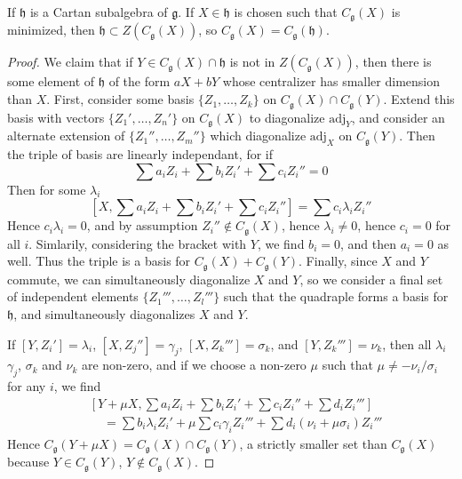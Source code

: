 \begin{lemma}
    If $\mathfrak{h}$ is a Cartan subalgebra of $\mathfrak{g}$. If $X \in \mathfrak{h}$ is chosen such that $C_\mathfrak{g}(X)$ is minimized, then $\mathfrak{h} \subset Z(C_\mathfrak{g}(X))$, so $C_\mathfrak{g}(X) = C_\mathfrak{g}(\mathfrak{h})$.
\end{lemma}
\begin{proof}
    We claim that if $Y \in C_\mathfrak{g}(X) \cap \mathfrak{h}$ is not in $Z(C_\mathfrak{g}(X))$, then there is some element of $\mathfrak{h}$ of the form $aX + bY$ whose centralizer has smaller dimension than $X$. First, consider some basis $\{ Z_1, \dots, Z_k \}$ on $C_\mathfrak{g}(X) \cap C_\mathfrak{g}(Y)$. Extend this basis with vectors $\{ Z_1', \dots, Z_n' \}$ on $C_\mathfrak{g}(X)$ to diagonalize $\text{adj}_Y$, and consider an alternate extension of $\{ Z_1'', \dots, Z_m'' \}$ which diagonalize $\text{adj}_X$ on $C_\mathfrak{g}(Y)$. Then the triple of basis are linearly independant, for if
    \[ \sum a_i Z_i + \sum b_i Z_i' + \sum c_i Z_i'' = 0 \]
    Then for some $\lambda_i$
    \[ \left[ X, \sum a_i Z_i + \sum b_i Z_i' + \sum c_i Z_i'' \right] = \sum c_i \lambda_i Z_i'' \]
    Hence $c_i \lambda_i = 0$, and by assumption $Z_i'' \not \in C_\mathfrak{g}(X)$, hence $\lambda_i \neq 0$, hence $c_i = 0$ for all $i$. Simlarily, considering the bracket with $Y$, we find $b_i = 0$, and then $a_i = 0$ as well. Thus the triple is a basis for $C_\mathfrak{g}(X) + C_\mathfrak{g}(Y)$. Finally, since $X$ and $Y$ commute, we can simultaneously diagonalize $X$ and $Y$, so we consider a final set of independent elements $\{ Z_1''', \dots, Z_l''' \}$ such that the quadraple forms a basis for $\mathfrak{h}$, and simultaneously diagonalizes $X$ and $Y$.

    If $[Y,Z_i'] = \lambda_i$, $[X,Z_j''] = \gamma_j$, $[X,Z_k'''] = \sigma_k$, and $[Y,Z_k'''] = \nu_k$, then all $\lambda_i$ $\gamma_j$, $\sigma_k$ and $\nu_k$ are non-zero, and if we choose a non-zero $\mu$ such that $\mu \neq - \nu_i/\sigma_i$ for any $i$, we find
    \begin{align*}
        &\left[ Y + \mu X, \sum a_i Z_i + \sum b_i Z_i' + \sum c_i Z_i'' + \sum d_i Z_i''' \right]\\
        &\ \ \ \ \ = \sum b_i \lambda_i Z_i' + \mu \sum c_i \gamma_i Z_i''' + \sum d_i \left( \nu_i + \mu \sigma_i \right) Z_i'''
    \end{align*}
    Hence $C_\mathfrak{g}(Y + \mu X) = C_\mathfrak{g}(X) \cap C_\mathfrak{g}(Y)$, a strictly smaller set than $C_\mathfrak{g}(X)$ because $Y \in C_\mathfrak{g}(Y)$, $Y \not \in C_\mathfrak{g}(X)$.
\end{proof}

